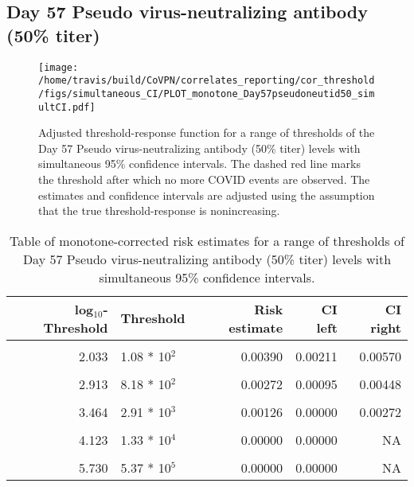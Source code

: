 \documentclass[]{book}
\theoremstyle{definition}
\theoremstyle{definition}
\theoremstyle{definition}
\newcommand{\1}{\mathbbm{1}}
\begin{document}
\clearpage

\clearpage

\clearpage

\hypertarget{day-57-pseudo-virus-neutralizing-antibody-50-titer-3}{%
\subsection{Day 57 Pseudo virus-neutralizing antibody (50\% titer)}\label{day-57-pseudo-virus-neutralizing-antibody-50-titer-3}}

\begin{figure}[H]
\centering
\texttt{[image: /home/travis/build/CoVPN/correlates\_reporting/cor\_threshold/figs/simultaneous\_CI/PLOT\_monotone\_Day57pseudoneutid50\_simultCI.pdf]}
\caption{Adjusted threshold-response function for a range of thresholds of the
  Day 57 Pseudo virus-neutralizing antibody (50\% titer) levels with simultaneous 95\% confidence intervals. The dashed red line marks the threshold after which no more COVID events are observed. The estimates and confidence intervals are adjusted using the assumption that the true threshold-response is nonincreasing.}
\end{figure}
\begin{table}[!h]

\caption{\label{tab:unnamed-chunk-399}Table of monotone-corrected risk estimates for a range of thresholds of Day 57 Pseudo virus-neutralizing antibody (50\% titer) levels with simultaneous 95\% confidence intervals.}
\centering
\begin{tabular}[t]{rlrrr}
\toprule
log$_{10}$-Threshold & Threshold & Risk estimate & CI left & CI right\\
\midrule
\cellcolor{gray!6}{0.699} & \cellcolor{gray!6}{5.00 * 10$^0$} & \cellcolor{gray!6}{0.00508} & \cellcolor{gray!6}{0.00314} & \cellcolor{gray!6}{0.00701}\\
2.033 & 1.08 * 10$^2$ & 0.00390 & 0.00211 & 0.00570\\
\cellcolor{gray!6}{2.447} & \cellcolor{gray!6}{2.80 * 10$^2$} & \cellcolor{gray!6}{0.00347} & \cellcolor{gray!6}{0.00165} & \cellcolor{gray!6}{0.00529}\\
2.913 & 8.18 * 10$^2$ & 0.00272 & 0.00095 & 0.00448\\
\cellcolor{gray!6}{3.196} & \cellcolor{gray!6}{1.57 * 10$^3$} & \cellcolor{gray!6}{0.00235} & \cellcolor{gray!6}{0.00055} & \cellcolor{gray!6}{0.00416}\\
3.464 & 2.91 * 10$^3$ & 0.00126 & 0.00000 & 0.00272\\
\cellcolor{gray!6}{3.736} & \cellcolor{gray!6}{5.45 * 10$^3$} & \cellcolor{gray!6}{0.00126} & \cellcolor{gray!6}{0.00000} & \cellcolor{gray!6}{0.00304}\\
4.123 & 1.33 * 10$^4$ & 0.00000 & 0.00000 & NA\\
\cellcolor{gray!6}{4.629} & \cellcolor{gray!6}{4.26 * 10$^4$} & \cellcolor{gray!6}{0.00000} & \cellcolor{gray!6}{0.00000} & \cellcolor{gray!6}{NA}\\
5.730 & 5.37 * 10$^5$ & 0.00000 & 0.00000 & NA\\
\bottomrule
\end{tabular}
\end{table}
\end{document}
